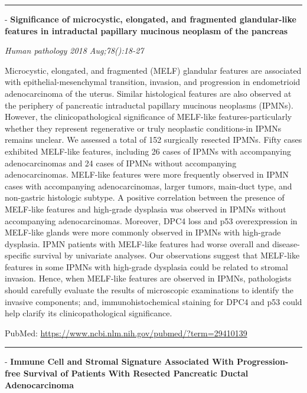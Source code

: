\documentclass[]{article}
\begin{document}
\begin{center}\rule{0.5\linewidth}{\linethickness}\end{center}

 - \textbf{Significance of microcystic, elongated, and fragmented
glandular-like features in intraductal papillary mucinous neoplasm of
the pancreas}

\emph{Human pathology 2018 Aug;78():18-27}

Microcystic, elongated, and fragmented (MELF) glandular features are
associated with epithelial-mesenchymal transition, invasion, and
progression in endometrioid adenocarcinoma of the uterus. Similar
histological features are also observed at the periphery of pancreatic
intraductal papillary mucinous neoplasms (IPMNs). However, the
clinicopathological significance of MELF-like features-particularly
whether they represent regenerative or truly neoplastic conditions-in
IPMNs remains unclear. We assessed a total of 152 surgically resected
IPMNs. Fifty cases exhibited MELF-like features, including 26 cases of
IPMNs with accompanying adenocarcinomas and 24 cases of IPMNs without
accompanying adenocarcinomas. MELF-like features were more frequently
observed in IPMN cases with accompanying adenocarcinomas, larger tumors,
main-duct type, and non-gastric histologic subtype. A positive
correlation between the presence of MELF-like features and high-grade
dysplasia was observed in IPMNs without accompanying adenocarcinomas.
Moreover, DPC4 loss and p53 overexpression in MELF-like glands were more
commonly observed in IPMNs with high-grade dysplasia. IPMN patients with
MELF-like features had worse overall and disease-specific survival by
univariate analyses. Our observations suggest that MELF-like features in
some IPMNs with high-grade dysplasia could be related to stromal
invasion. Hence, when MELF-like features are observed in IPMNs,
pathologists should carefully evaluate the results of microscopic
examinations to identify the invasive components; and,
immunohistochemical staining for DPC4 and p53 could help clarify its
clinicopathological significance.

PubMed: \url{https://www.ncbi.nlm.nih.gov/pubmed/?term=29410139}

{}

{}

\begin{center}\rule{0.5\linewidth}{\linethickness}\end{center}

 - \textbf{Immune Cell and Stromal Signature Associated With
Progression-free Survival of Patients With Resected Pancreatic Ductal
Adenocarcinoma}
\end{document}
